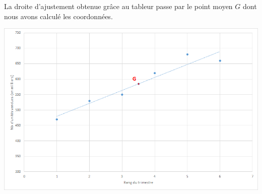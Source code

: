 \begin{myex}
	La droite d'ajustement obtenue grâce au tableur passe par le point moyen $G$ dont nous avons calculé les coordonnées.
	\begin{center}
		\includegraphics[scale =0.7]{./img/graph2}		
	\end{center}

\end{myex}
